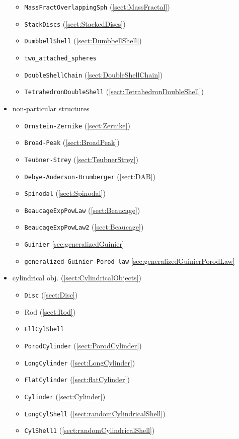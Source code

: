 \begin{itemize}
\begin{itemize}
\item \texttt{MassFractOverlappingSph} (\ref{sect:MassFractal})
\item \texttt{StackDiscs} (\ref{sect:StackedDiscs})
\item \texttt{DumbbellShell} (\ref{sect:DumbbellShell})
\item \texttt{two\_attached\_spheres}
\item \texttt{DoubleShellChain} (\ref{sect:DoubleShellChain})
\item \texttt{TetrahedronDoubleShell} (\ref{sect:TetrahedronDoubleShell})
\end{itemize}
\item non-particular structures
\begin{itemize}
\item \texttt{Ornstein-Zernike} (\ref{sect:Zernike})
\item \texttt{Broad-Peak} (\ref{sect:BroadPeak})
\item \texttt{Teubner-Strey} (\ref{sect:TeubnerStrey})
\item \texttt{Debye-Anderson-Brumberger} (\ref{sect:DAB})
\item \texttt{Spinodal} (\ref{sect:Spinodal})
\item \texttt{BeaucageExpPowLaw} (\ref{sect:Beaucage})
\item \texttt{BeaucageExpPowLaw2} (\ref{sect:Beaucage})
\item \texttt{Guinier} \ref{sec:generalizedGuinier}
\item \texttt{generalized Guinier-Porod law} \ref{sec:generalizedGuinierPorodLaw}
\end{itemize}
\item cylindrical obj. (\ref{sect:CylindricalObjects})
\begin{itemize}
\item \texttt{Disc} (\ref{sect:Disc})
\item Rod (\ref{sect:Rod})
\item \texttt{EllCylShell}
\item \texttt{PorodCylinder} (\ref{sect:PorodCylinder})
\item \texttt{LongCylinder} (\ref{sect:LongCylinder})
\item \texttt{FlatCylinder} (\ref{sect:flatCylinder})
\item \texttt{Cylinder} (\ref{sect:Cylinder})
\item \texttt{LongCylShell} (\ref{sect:randomCylindricalShell})
\item \texttt{CylShell1} (\ref{sect:randomCylindricalShell})

\end{itemize}
\end{itemize}
